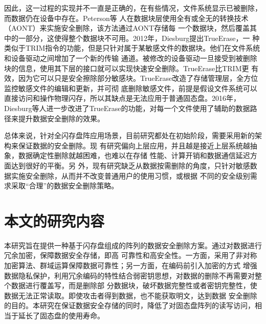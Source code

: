 因此，这一过程的实现并不一直是正确的，在有些情况，文件系统显示已被删除，而数据仍在设备中存在。Peterson等
人\cite{Peterson2005Secure}在数据块层使用全有或全无的转换技术（AONT）来实施安全删除，该方法通过AONT存储每
一个数据块，然后覆盖其中的一部分，这使得整个数据块不可用。2012年，Diesburg提出TrueErase\cite{Diesburg2012TrueErase}，一
种类似于TRIM指令的功能，但是只针对属于某敏感文件的数据块。他们在文件系统和设备驱动之间增加了一个新的传输
通道。被修改的设备驱动一旦接受到被删除块的信息，使用其下层的接口就可以实现快速安全删除。TrueErase比TRIM更
有效，因为它可以只是安全擦除部分敏感块。TrueErase改造了存储管理层，全方位监控敏感文件的编辑和更新，并可彻
底删除敏感文件，前提是假设文件系统可以直接访问和操作物理闪存，所以其缺点是无法应用于普通固态盘。2016年，
Diesburg等人进一步改进了TrueErase的功能，对每一个文件使用了辅助的数据路径来提升数据安全删除的效果\cite{diesburg2016trueerase}。


总体来说，针对全闪存盘阵应用场景，目前研究都处在初始阶段，需要采用新的架构来保证数据的安全删除\cite{傅颖勋2013安全云存储系统与关键技术综述}。现
有研究偏向上层应用，并且越是接近上层系统越抽象，数据确定性删除就越困难\cite{Reardon2013SoK}，也难以在存储
性能、计算开销和数据通信延迟方面达到很好的平衡\cite{李晖2014公共云存储服务数据安全及隐私保护技术综述}。另
外，现有研究缺乏从数据按需删除的角度，只针对敏感数据实施安全删除，从而并不改变普通用户的使用习惯，或根据
不同的安全级别需求采取“合理”的数据安全删除策略。
\section{本文的研究内容}
本研究旨在提供一种基于闪存盘组成的阵列的数据安全删除方案。通过对数据进行冗余加密，保障数据安全存储，即高
可靠性和高安全性。一方面，采用了非对称加密算法、群域运算保障数据可靠性；另一方面，在编码前引入加密的方式
增强数据隐私保护，利用冗余编码的特性结合弱密钥思想，对数据的删除不再需要对整个数据进行覆盖写，而是删除部
分数据块，破坏数据完整性或者密钥完整性，使数据无法正常读取。即使攻击者得到数据，也不能获取明文，达到数据
安全删除的目的。本研究在保证数据安全存储的同时，降低了对固态盘阵列的读写访问，相当于延长了固态盘的使用寿命。
